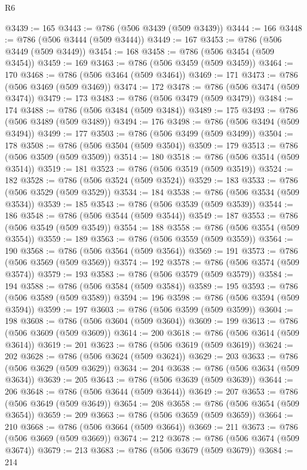 \begin{lexlean}{R6}
\begin{coremodule}
@3439 := 165
@3443 := @786 (@506 @3439 (@509 @3439))
@3444 := 166
@3448 := @786 (@506 @3444 (@509 @3444))
@3449 := 167
@3453 := @786 (@506 @3449 (@509 @3449))
@3454 := 168
@3458 := @786 (@506 @3454 (@509 @3454))
@3459 := 169
@3463 := @786 (@506 @3459 (@509 @3459))
@3464 := 170
@3468 := @786 (@506 @3464 (@509 @3464))
@3469 := 171
@3473 := @786 (@506 @3469 (@509 @3469))
@3474 := 172
@3478 := @786 (@506 @3474 (@509 @3474))
@3479 := 173
@3483 := @786 (@506 @3479 (@509 @3479))
@3484 := 174
@3488 := @786 (@506 @3484 (@509 @3484))
@3489 := 175
@3493 := @786 (@506 @3489 (@509 @3489))
@3494 := 176
@3498 := @786 (@506 @3494 (@509 @3494))
@3499 := 177
@3503 := @786 (@506 @3499 (@509 @3499))
@3504 := 178
@3508 := @786 (@506 @3504 (@509 @3504))
@3509 := 179
@3513 := @786 (@506 @3509 (@509 @3509))
@3514 := 180
@3518 := @786 (@506 @3514 (@509 @3514))
@3519 := 181
@3523 := @786 (@506 @3519 (@509 @3519))
@3524 := 182
@3528 := @786 (@506 @3524 (@509 @3524))
@3529 := 183
@3533 := @786 (@506 @3529 (@509 @3529))
@3534 := 184
@3538 := @786 (@506 @3534 (@509 @3534))
@3539 := 185
@3543 := @786 (@506 @3539 (@509 @3539))
@3544 := 186
@3548 := @786 (@506 @3544 (@509 @3544))
@3549 := 187
@3553 := @786 (@506 @3549 (@509 @3549))
@3554 := 188
@3558 := @786 (@506 @3554 (@509 @3554))
@3559 := 189
@3563 := @786 (@506 @3559 (@509 @3559))
@3564 := 190
@3568 := @786 (@506 @3564 (@509 @3564))
@3569 := 191
@3573 := @786 (@506 @3569 (@509 @3569))
@3574 := 192
@3578 := @786 (@506 @3574 (@509 @3574))
@3579 := 193
@3583 := @786 (@506 @3579 (@509 @3579))
@3584 := 194
@3588 := @786 (@506 @3584 (@509 @3584))
@3589 := 195
@3593 := @786 (@506 @3589 (@509 @3589))
@3594 := 196
@3598 := @786 (@506 @3594 (@509 @3594))
@3599 := 197
@3603 := @786 (@506 @3599 (@509 @3599))
@3604 := 198
@3608 := @786 (@506 @3604 (@509 @3604))
@3609 := 199
@3613 := @786 (@506 @3609 (@509 @3609))
@3614 := 200
@3618 := @786 (@506 @3614 (@509 @3614))
@3619 := 201
@3623 := @786 (@506 @3619 (@509 @3619))
@3624 := 202
@3628 := @786 (@506 @3624 (@509 @3624))
@3629 := 203
@3633 := @786 (@506 @3629 (@509 @3629))
@3634 := 204
@3638 := @786 (@506 @3634 (@509 @3634))
@3639 := 205
@3643 := @786 (@506 @3639 (@509 @3639))
@3644 := 206
@3648 := @786 (@506 @3644 (@509 @3644))
@3649 := 207
@3653 := @786 (@506 @3649 (@509 @3649))
@3654 := 208
@3658 := @786 (@506 @3654 (@509 @3654))
@3659 := 209
@3663 := @786 (@506 @3659 (@509 @3659))
@3664 := 210
@3668 := @786 (@506 @3664 (@509 @3664))
@3669 := 211
@3673 := @786 (@506 @3669 (@509 @3669))
@3674 := 212
@3678 := @786 (@506 @3674 (@509 @3674))
@3679 := 213
@3683 := @786 (@506 @3679 (@509 @3679))
@3684 := 214

\end{coremodule}
\end{lexlean}
